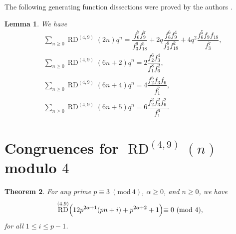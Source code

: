 \documentclass[12pt]{amsart}
\DeclareMathOperator {\myRD}{RD}
\theoremstyle{plain}
\newtheorem{theorem}{Theorem}[section]
\newtheorem{lemma}[theorem]{Lemma}
\theoremstyle{definition}
\begin{document}
The following generating function dissections were proved by the authors \cite{NadjiAhmia2024}.
 \begin{lemma} \label{lemmanadjiahmia} We have
\begin{align}
&\sum_{n\geq 0} \myRD^{(4, 9)}(2n)q^{n}=\dfrac{f_{6}^{7}f_{9}^{7}}{f_{3}^{9}f_{18}^{5}}+2q\dfrac{f_{6}^{6}f_{9}^{4}}{f_{3}^{8}f_{18}^{2}}+4q^{2}\dfrac{f_{6}^{5}f_{9}f_{18}}{f_{3}^{7}}, \label{dd1}\\
&\sum_{n\geq 0} \myRD^{(4, 9)}(6n+2)q^{n}=2\dfrac{f_{2}^{6}f_{3}^{4}}{f_{1}^{8}f_{6}^{2}}, \label{d1}\\
&\sum_{n\geq 0} \myRD^{(4, 9)}(6n+4)q^{n}=4\dfrac{f_{2}^{5}f_{3}f_{6}}{f_{1}^{7}}, \label{d2}\\
&\sum_{n\geq 0} \myRD^{(4, 9)}(6n+5)q^{n}= 6\dfrac{f_{2}^{2}f_{3}^{2}f_{6}^{2}}{f_{1}^{6}}. \label{d3}
\end{align}
\end{lemma}



\section{Congruences for $\myRD^{(4, 9)}(n)$ modulo $4$}

\begin{theorem}\label{teor43g} For any prime $p \equiv 3 \ (\mathrm{mod} \ 4)$, $\alpha\geq 0$, and $n\geq 0$, we have
\begin{equation*}
\myRD^{(4, 9)}\Bigl( 12p^{2\alpha+1}(pn+i)+ p^{2\alpha+2}+1 \Bigl) \equiv 0 \ (\mathrm{mod} \ 4),
\end{equation*}
for all  $1\leq i \leq p-1$.
\end{theorem}
\end{document}
